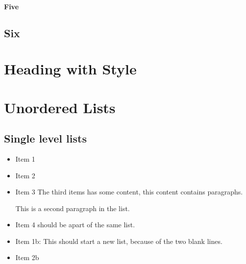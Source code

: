 \paragraph{\label{five}Five}
\subsection{\label{six}Six}
\section{\label{heading-with-style}Heading with Style}
\section{\label{unordered-lists}Unordered Lists}
\subsection{\label{unordered-single-level-lists}Single level lists}
\begin{itemize}
\item
\par Item 1
\item
\par Item 2
\item
\par Item 3 The third items has some content, this content contains paragraphs.
\par This is a second paragraph in the list.
\par
\item
\par Item 4 should be apart of the same list.
\end{itemize}

\begin{itemize}
\item
\par Item 1b: This should start a new list, because of the two blank lines.
\item
\par Item 2b
\end{itemize}

